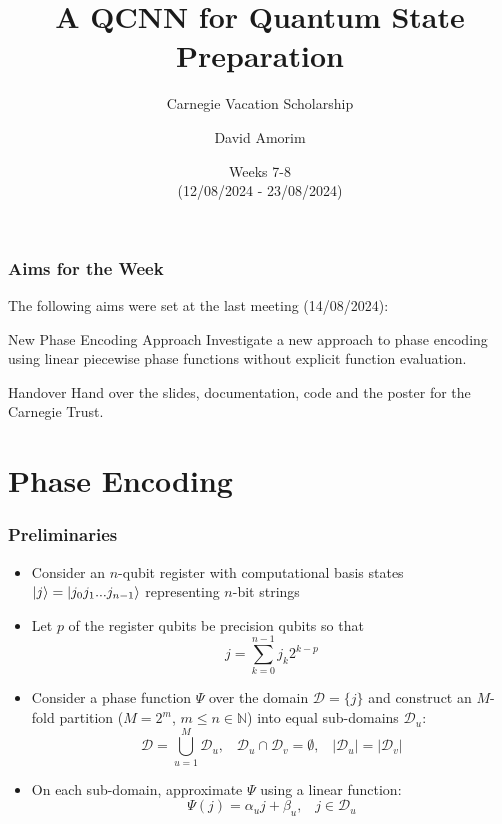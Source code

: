 \documentclass{beamer}
\title[QCNN State Preparation]{A QCNN for Quantum State Preparation}
\subtitle{Carnegie Vacation Scholarship}
\author[David Amorim]{David Amorim}
\institute[]{}
\date[21/08/2024]{Weeks 7-8 \\(12/08/2024 - 23/08/2024)}
\begin{document}
\frame{\titlepage}

\begin{frame}
\frametitle{Aims for the Week}
The following aims were set at the last meeting (14/08/2024):

\begin{alertblock}{New Phase Encoding Approach}
Investigate a new approach to phase encoding using linear piecewise phase functions without explicit function evaluation.  
\end{alertblock}

\begin{alertblock}{Handover}
Hand over the slides, documentation, code and the poster for the Carnegie Trust.
\end{alertblock}
\end{frame}

\section{Phase Encoding}

\begin{frame}
\frametitle{Preliminaries}

\begin{itemize}
\item Consider an \alert{$n$-qubit} register with computational basis states $\ket{j} = \ket{j_0 j_1 ... j_{n-1}}$ representing $n$-bit strings
\item Let \alert{$p$} of the register qubits be \alert{precision qubits} so that 
\begin{equation}
j = \sum^{n -1}_{k=0} j_k 2^{k-p}
\end{equation} 
\item Consider a \alert{phase function} $\Psi$ over the domain $\mathcal{D} = \{ j \}$ and construct an \alert{$M$-fold partition} ($M = 2^m$, $m \leq n \in \mathbb{N}$) into equal sub-domains $\mathcal{D}_u$:
\begin{equation}
\mathcal{D} = \bigcup_{u=1}^M \mathcal{D}_u, \; \; \; \mathcal{D}_u \cap \mathcal{D}_v = \emptyset, \;  \; \; |\mathcal{D}_u| = |\mathcal{D}_v|
\end{equation}
\item On each sub-domain, approximate $\Psi$ using a \alert{linear function}:
\begin{equation}
\Psi(j) = \alpha_u j + \beta_u, \; \; \; j \in \mathcal{D}_u
\end{equation}
\end{itemize}
\end{frame}
\end{document}
